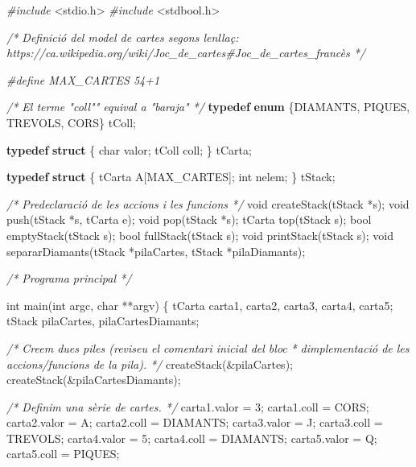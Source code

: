 \documentclass[]{book}
\newenvironment{Shaded}{\begin{snugshade}}{\end{snugshade}}
\newcommand{\CharTok}[1]{\textcolor[rgb]{0.31,0.60,0.02}{#1}}
\newcommand{\CommentTok}[1]{\textcolor[rgb]{0.56,0.35,0.01}{\textit{#1}}}
\newcommand{\DataTypeTok}[1]{\textcolor[rgb]{0.13,0.29,0.53}{#1}}
\newcommand{\ImportTok}[1]{#1}
\newcommand{\KeywordTok}[1]{\textcolor[rgb]{0.13,0.29,0.53}{\textbf{#1}}}
\newcommand{\NormalTok}[1]{#1}
\newcommand{\PreprocessorTok}[1]{\textcolor[rgb]{0.56,0.35,0.01}{\textit{#1}}}
\begin{document}
\begin{Shaded}
\begin{Highlighting}[]
\PreprocessorTok{\#include }\ImportTok{\textless{}stdio.h\textgreater{}}
\PreprocessorTok{\#include }\ImportTok{\textless{}stdbool.h\textgreater{}}

\CommentTok{/* Definició del model de cartes segons l\textquotesingle{}enllaç:}
\CommentTok{   https://ca.wikipedia.org/wiki/Joc\_de\_cartes\#Joc\_de\_cartes\_francès */}

\PreprocessorTok{\#define MAX\_CARTES 54+1}

\CommentTok{/* El terme "coll"" equival a "baraja" */}
\KeywordTok{typedef} \KeywordTok{enum}\NormalTok{ \{DIAMANTS, PIQUES, TREVOLS, CORS\} tColl;}

\KeywordTok{typedef} \KeywordTok{struct}\NormalTok{ \{}
    \DataTypeTok{char}\NormalTok{ valor;}
\NormalTok{    tColl coll;}
\NormalTok{\} tCarta;}

\KeywordTok{typedef} \KeywordTok{struct}\NormalTok{ \{}
\NormalTok{    tCarta A[MAX\_CARTES];}
    \DataTypeTok{int}\NormalTok{ nelem;}
\NormalTok{\} tStack;}

\CommentTok{/* Predeclaració de les accions i les funcions */}
\DataTypeTok{void}\NormalTok{ createStack(tStack *s);}
\DataTypeTok{void}\NormalTok{ push(tStack *s, tCarta e);}
\DataTypeTok{void}\NormalTok{ pop(tStack *s);}
\NormalTok{tCarta top(tStack s);}
\DataTypeTok{bool}\NormalTok{ emptyStack(tStack s);}
\DataTypeTok{bool}\NormalTok{ fullStack(tStack s);}
\DataTypeTok{void}\NormalTok{ printStack(tStack s);}
\DataTypeTok{void}\NormalTok{ separarDiamants(tStack *pilaCartes, tStack *pilaDiamants);}

\CommentTok{/* Programa principal */}

\DataTypeTok{int}\NormalTok{ main(}\DataTypeTok{int}\NormalTok{ argc, }\DataTypeTok{char}\NormalTok{ **argv) \{}
\NormalTok{    tCarta carta1, carta2, carta3, carta4, carta5;}
\NormalTok{    tStack pilaCartes, pilaCartesDiamants;}
    
    \CommentTok{/* Creem dues piles (reviseu el comentari inicial del bloc}
\CommentTok{     * d\textquotesingle{}implementació de les accions/funcions de la pila). }
\CommentTok{     */}
\NormalTok{    createStack(\&pilaCartes);}
\NormalTok{    createStack(\&pilaCartesDiamants);}
    
    \CommentTok{/* Definim una sèrie de cartes. */}
\NormalTok{    carta1.valor = }\CharTok{\textquotesingle{}3\textquotesingle{}}\NormalTok{;}
\NormalTok{    carta1.coll = CORS;}
\NormalTok{    carta2.valor = }\CharTok{\textquotesingle{}A\textquotesingle{}}\NormalTok{;}
\NormalTok{    carta2.coll = DIAMANTS;}
\NormalTok{    carta3.valor = }\CharTok{\textquotesingle{}J\textquotesingle{}}\NormalTok{;}
\NormalTok{    carta3.coll = TREVOLS;}
\NormalTok{    carta4.valor = }\CharTok{\textquotesingle{}5\textquotesingle{}}\NormalTok{;}
\NormalTok{    carta4.coll = DIAMANTS;}
\NormalTok{    carta5.valor = }\CharTok{\textquotesingle{}Q\textquotesingle{}}\NormalTok{;}
\NormalTok{    carta5.coll = PIQUES;}
    

\end{Highlighting}
\end{Shaded}
\end{document}
